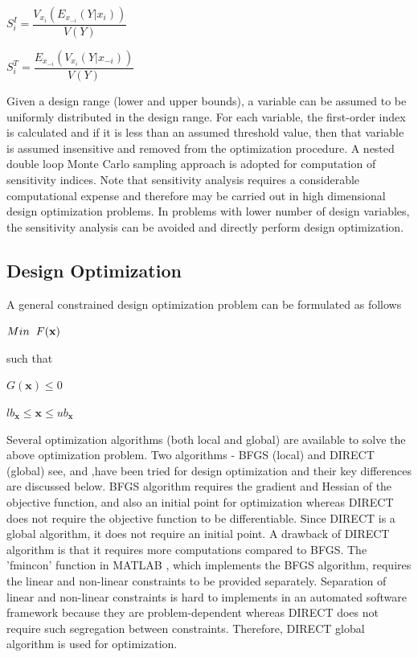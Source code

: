 \documentclass[10pt]{article}
\begin{document}
\centerline{$S_{i}^{I} = \dfrac{V_{x_i}(E_{x_{-i}}(Y|x_{i}))}{V(Y)}$}
\centerline{$S_{i}^{T} = \dfrac{E_{x_{-i}}(V_{x_{i}}(Y|x_{-i}))}{V(Y)}$}

Given a design range (lower and upper bounds), a variable can be assumed to be uniformly distributed in the design range. For each variable, the first-order index is calculated and if it is less than an assumed threshold value, then that variable is assumed insensitive and removed from the optimization procedure. A nested double loop Monte Carlo sampling approach is adopted for computation of sensitivity indices. Note that sensitivity analysis requires a considerable computational expense and therefore may be carried out in high dimensional design optimization problems. In problems with lower number of design variables, the sensitivity analysis can be avoided and directly perform design optimization. 

\subsection{Design Optimization}
\label{subsec:Optimization}
\hspace{5 mm} A general constrained design optimization problem can be formulated as follows

\centerline{$Min \hspace{2 mm} F(\textbf{x})$}
such that

\centerline{$G(\textbf{x}) \leq 0$}
\centerline{$lb_{\textbf{x}} \leq \textbf{x} \leq ub_{\textbf{x}}$}

\noindent Several optimization algorithms (both local and global) are available to solve the above optimization problem. Two algorithms - BFGS (local) \cite{BFGS} and DIRECT (global) see, \cite{DirectUserGuide} and   \cite{DirectPaper},have been tried for design optimization and their key differences are discussed below. BFGS algorithm requires the gradient and Hessian of the objective function, and also an initial point for optimization whereas DIRECT does not require the objective function to be differentiable. Since DIRECT is a global algorithm, it does not require an initial point. A drawback of DIRECT algorithm is that it requires more computations compared to BFGS. The 'fmincon' function in MATLAB \cite{MATLAB:2014a}, which implements the BFGS algorithm, requires the linear and non-linear constraints to be provided separately. Separation of linear and non-linear constraints is hard to implements in an automated software framework because they are problem-dependent whereas DIRECT does not require such segregation between constraints. Therefore, DIRECT global algorithm is used for optimization.
\end{document}
